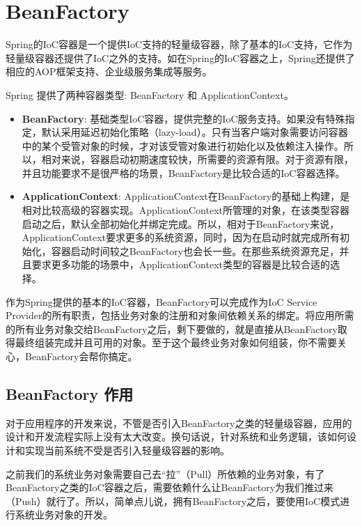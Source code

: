\section{BeanFactory}

Spring的IoC容器是一个提供IoC支持的轻量级容器，除了基本的IoC支持，它作为轻量级容器还提供了IoC之外的支持。如在Spring的IoC容器之上，Spring还提供了相应的AOP框架支持、企业级服务集成等服务。

Spring 提供了两种容器类型: BeanFactory 和 ApplicationContext。
\begin{itemize}
    \item \textbf{BeanFactory}: 基础类型IoC容器，提供完整的IoC服务支持。如果没有特殊指定，默认采用延迟初始化策略（lazy-load）。只有当客户端对象需要访问容器中的某个受管对象的时候，才对该受管对象进行初始化以及依赖注入操作。所以，相对来说，容器启动初期速度较快，所需要的资源有限。对于资源有限，并且功能要求不是很严格的场景，BeanFactory是比较合适的IoC容器选择。
    \item \textbf{ApplicationContext}: ApplicationContext在BeanFactory的基础上构建，是相对比较高级的容器实现。ApplicationContext所管理的对象，在该类型容器启动之后，默认全部初始化并绑定完成。所以，相对于BeanFactory来说，ApplicationContext要求更多的系统资源，同时，因为在启动时就完成所有初始化，容器启动时间较之BeanFactory也会长一些。在那些系统资源充足，并且要求更多功能的场景中，ApplicationContext类型的容器是比较合适的选择。
\end{itemize}

作为Spring提供的基本的IoC容器，BeanFactory可以完成作为IoC Service Provider的所有职责，包括业务对象的注册和对象间依赖关系的绑定。将应用所需的所有业务对象交给BeanFactory之后，剩下要做的，就是直接从BeanFactory取得最终组装完成并且可用的对象。至于这个最终业务对象如何组装，你不需要关心，BeanFactory会帮你搞定。

\subsection{BeanFactory 作用}

对于应用程序的开发来说，不管是否引入BeanFactory之类的轻量级容器，应用的设计和开发流程实际上没有太大改变。换句话说，针对系统和业务逻辑，该如何设计和实现当前系统不受是否引入轻量级容器的影响。

之前我们的系统业务对象需要自己去“拉”（Pull）所依赖的业务对象，有了BeanFactory之类的IoC容器之后，需要依赖什么让BeanFactory为我们推过来（Push）就行了。所以，简单点儿说，拥有BeanFactory之后，要使用IoC模式进行系统业务对象的开发。

